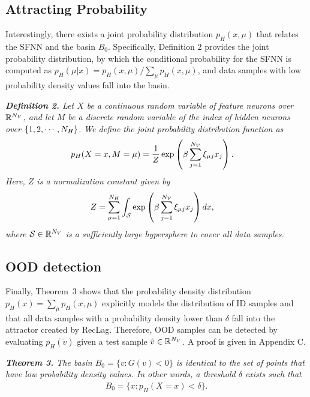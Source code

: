 \subsection{Attracting Probability}
Interestingly, there exists a joint probability distribution $p_{H}(x, \mu)$ that relates the SFNN and the basin $B_{0}$.
Specifically, Definition 2 provides the joint probability distribution, by which the conditional probability for the SFNN is computed as $p_{H}(\mu|x) = p_{H}(x, \mu)/\sum_{\mu}p_{H}(x, \mu)$, and data samples with low probability density values fall into the basin.

\vspace{5pt}
\noindent \textit{\textbf{Definition 2.}
Let $X$ be a continuous random variable of feature neurons over $\mathbb{R}^{N_{V}}$, and let $M$ be a discrete random variable of the index of hidden neurons over $\{1, 2, \cdots, N_{H}\}$.
We define the joint probability distribution function as
\begin{align}
\label{eq:reclagprob}
p_{H}(X=x, M=\mu) &= \frac{1}{Z} \exp \left(
{\beta \sum_{j=1}^{N_{V}} \xi_{\mu j} x_{j}}
\right).
\end{align}
Here, $Z$ is a normalization constant given by
\begin{align}
Z &= \sum_{\mu=1}^{N_{H}} \int_{\mathcal{S}}
\exp \left(
{\beta \sum_{j=1}^{N_{V}} \xi_{\mu j} x_{j}} \right) dx,
\end{align}
where $\mathcal{S} \in \mathbb{R}^{N_{V}}$ is a sufficiently large hypersphere to cover all data samples.
}

\subsection{OOD detection}
Finally, Theorem~3 shows that the probability density distribution $p_{H}(x) = \sum_{\mu} p_{H}(x, \mu)$ explicitly models the distribution of ID samples and that all data samples with a probability density lower than $\delta$ fall into the attractor created by RecLag.
Therefore, OOD samples can be detected by evaluating $p_{H}(\tilde{v})$ given a test sample $\tilde{v} \in \mathbb{R}^{N_{V}}$. A proof is given in Appendix C.

\vspace{5pt}
\noindent \textit{\textbf{Theorem 3.}
The basin $B_{0} = \{ v : G(v) < 0\}$ is identical to the set of points that have low probability density values.
In other words, a threshold $\delta$ exists such that
\begin{align}
B_{0} = \{x : p_{H}(X = x) < \delta\}.
\end{align}
}
\vspace{-8pt}


